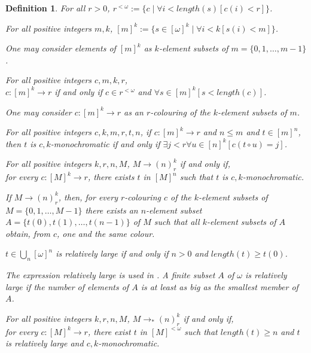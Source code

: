 \documentclass[a4paper]{amsart}
\theoremstyle{plain}
\newtheorem{definition}{Definition}
\begin{document}
\begin{definition}  
     For all $r>0$, $r^{<\omega}:=\{c\mid \forall i<length(s)[c(i)<r]\}$.
 
 \smallskip For all positive integers $m,k$, $[m]^k:=\{s\in [\omega]^k\mid\forall i<k[s(i) < m]\}$. 
 
 \emph{One may consider elements of $[m]^k$ as $k$-element subsets of $m=\{0,1,\ldots, m-1\}$}. 
   
   \smallskip For all positive integers  $c,m,k,r$, \\$c:[m]^k\rightarrow r$ if and only if $c\in r^{<\omega}$  and $\forall s \in [m]^k[s <\mathit{length}(c)]$. 
   
  \emph{One may consider $c:[m]^k\rightarrow r$ as an $r$-colouring of the $k$-element subsets of $m$.}
   
   \smallskip For all positive integers $c,k,m,r,t,n$, if $c:[m]^k\rightarrow r$ and $n\le m$ and $t\in [m]^n$, then \emph{$t$ is $c,k$-monochromatic} if and only if $\exists j<r\forall u \in [n]^k[c(t\circ u)=j]$. 
   
   
   \smallskip
   For all positive integers $k,r,n,M$, $M\rightarrow (n)^k_r$ if and only if,\\ for every $c:[M]^k\rightarrow r$, there exists    $t$ in $[M]^n$  such that  $t$ is $c,k$-monochromatic. 
   
   \emph{If $M\rightarrow (n)^k_r$, then, for every $r$-colouring $c$ of the $k$-element subsets of $M=\{0,1, \ldots, M-1\}$ there exists an $n$-element subset $A=\{t(0), t(1), \ldots, t(n-1)\}$ of $M$ such that all $k$-element subsets of $A$ obtain, from $c$, one and the same colour}. 
   
   \smallskip $t\in\bigcup_n[\omega]^n$ is \emph{relatively large} if and only if $n>0$ and $length(t)\ge t(0)$.
   
   \emph{The expression \emph{relatively large} is used in \cite{parisharrington}. A finite subset $A$ of $\omega$ is relatively large if the number of elements of $A$ is at least as big as the smallest member of $A$.}
   
   \smallskip
   For all positive integers $k,r,n,M$, $M\rightarrow_{\ast} (n)^k_r$ if and only if,\\ for every $c:[M]^k\rightarrow r$,  there exist   $t$  in $[M]^{<\omega}$ such that $length(t)\ge n$ and $t$ is relatively large and  $c,k$-monochromatic. 
   
   
   \end{definition}
	 
\end{document}
